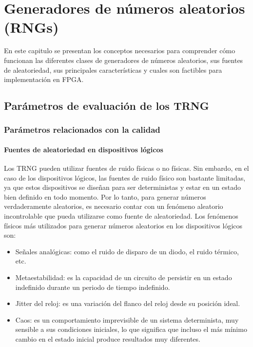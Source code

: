 \chapter{Generadores de números aleatorios (RNGs)}

    En este capitulo se presentan los conceptos necesarios para comprender cómo funcionan las diferentes clases de generadores de números aleatorios, sus fuentes de aleatoriedad, sus principales características y cuales son factibles para implementación en FPGA.

   
    \section{Parámetros de evaluación de los TRNG}
        
        \subsection{Parámetros relacionados con la calidad}	

            \subsubsection{Fuentes de aleatoriedad en dispositivos lógicos} 

            Los TRNG pueden utilizar fuentes de ruido físicas o no físicas. Sin embardo, en el caso de los dispositivos lógicos, las fuentes de ruido físico son bastante limitadas, ya que estos dispositivos se diseñan para ser deterministas y estar en un estado bien definido en todo momento. Por lo tanto, para generar números verdaderamente aleatorios, es necesario contar con un fenómeno aleatorio incontrolable que pueda utilizarse como fuente de aleatoriedad. Los fenómenos físicos más utilizados para generar números aleatorios en los dispositivos lógicos son:
	
            \begin{itemize}[noitemsep]
                \item Señales analógicas: como el ruido de disparo de un diodo, el ruido térmico, etc.		

                \item Metaestabilidad: es la capacidad de un circuito de persistir en un estado indefinido durante un periodo de tiempo indefinido.
                
                \item Jitter del reloj: es una variación del flanco del reloj desde su posición ideal.
                
                \item Caos: es un comportamiento imprevisible de un sistema determinista, muy sensible a sus condiciones iniciales, lo que significa que incluso el más mínimo cambio en el estado inicial produce resultados muy diferentes.
            \end{itemize}		
	
